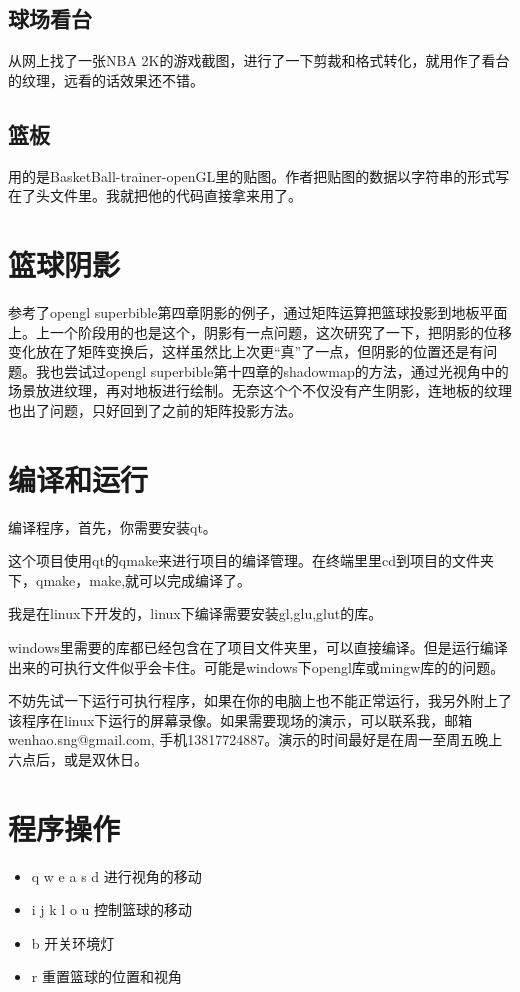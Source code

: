 \documentclass[10pt,a4paper]{article}
\begin{document}
\subsection{球场看台}
从网上找了一张NBA 2K的游戏截图，进行了一下剪裁和格式转化，就用作了看台的纹理，远看的话效果还不错。
\subsection{篮板}
用的是BasketBall-trainer-openGL里的贴图。作者把贴图的数据以字符串的形式写在了头文件里。我就把他的代码直接拿来用了。

\section{篮球阴影}
参考了opengl superbible第四章阴影的例子，通过矩阵运算把篮球投影到地板平面上。上一个阶段用的也是这个，阴影有一点问题，这次研究了一下，把阴影的位移变化放在了矩阵变换后，这样虽然比上次更“真”了一点，但阴影的位置还是有问题。我也尝试过opengl superbible第十四章的shadowmap的方法，通过光视角中的场景放进纹理，再对地板进行绘制。无奈这个个不仅没有产生阴影，连地板的纹理也出了问题，只好回到了之前的矩阵投影方法。

\section{编译和运行}
编译程序，首先，你需要安装qt。

这个项目使用qt的qmake来进行项目的编译管理。在终端里里cd到项目的文件夹下，qmake，make,就可以完成编译了。

我是在linux下开发的，linux下编译需要安装gl,glu,glut的库。

windows里需要的库都已经包含在了项目文件夹里，可以直接编译。但是运行编译出来的可执行文件似乎会卡住。可能是windows下opengl库或mingw库的的问题。

不妨先试一下运行可执行程序，如果在你的电脑上也不能正常运行，我另外附上了该程序在linux下运行的屏幕录像。如果需要现场的演示，可以联系我，邮箱wenhao.sng@gmail.com, 手机13817724887。演示的时间最好是在周一至周五晚上六点后，或是双休日。

\section{程序操作}
\begin{itemize}
  \item q w e a s d 进行视角的移动
  \item i j k l o u 控制篮球的移动
  \item b 开关环境灯
  \item r 重置篮球的位置和视角
\end{itemize}
\end{document}
